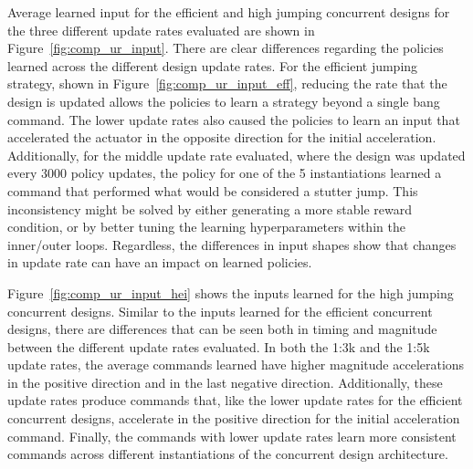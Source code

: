 Average learned input for the efficient and high jumping concurrent designs for the three different update rates evaluated are shown in Figure~\ref{fig:comp_ur_input}. There are clear differences regarding the policies learned across the different design update rates. For the efficient jumping strategy, shown in Figure~\ref{fig:comp_ur_input_eff}, reducing the rate that the design is updated allows the policies to learn a strategy beyond a single bang command. The lower update rates also caused the policies to learn an input that accelerated the actuator in the opposite direction for the initial acceleration. Additionally, for the middle update rate evaluated, where the design was updated every 3000 policy updates, the policy for one of the 5 instantiations learned a command that performed what would be considered a stutter jump. This inconsistency might be solved by either generating a more stable reward condition, or by better tuning the learning hyperparameters within the inner/outer loops. Regardless, the differences in input shapes show that changes in update rate can have an impact on learned policies. 

Figure~\ref{fig:comp_ur_input_hei} shows the inputs learned for the high jumping concurrent designs. Similar to the inputs learned for the efficient concurrent designs, there are differences that can be seen both in timing and magnitude between the different update rates evaluated. In both the 1:3k and the 1:5k update rates, the average commands learned have higher magnitude accelerations in the positive direction and in the last negative direction. Additionally, these update rates produce commands that, like the lower update rates for the efficient concurrent designs, accelerate in the positive direction for the initial acceleration command. Finally, the commands with lower update rates learn more consistent commands across different instantiations of the concurrent design architecture. 

